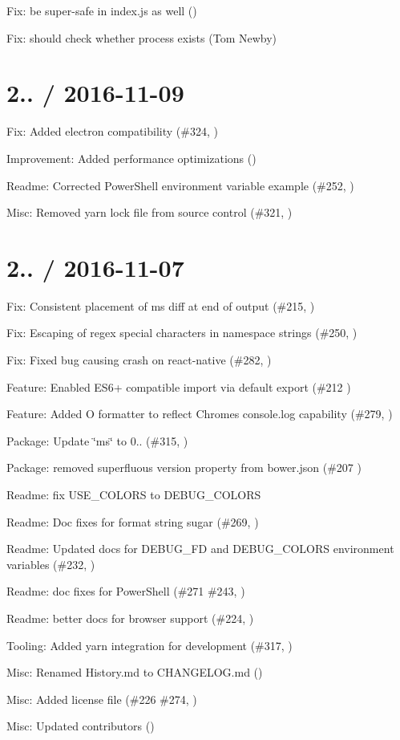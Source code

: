 \begin{DoxyItemize}
\item Fix\+: be super-\/safe in index.\+js as well ()
\item Fix\+: should check whether process exists (Tom Newby)
\end{DoxyItemize}

\section*{2.. / 2016-\/11-\/09 }


\begin{DoxyItemize}
\item Fix\+: Added electron compatibility (\#324, )
\item Improvement\+: Added performance optimizations ()
\item Readme\+: Corrected Power\+Shell environment variable example (\#252, )
\item Misc\+: Removed yarn lock file from source control (\#321, )
\end{DoxyItemize}

\section*{2.. / 2016-\/11-\/07 }


\begin{DoxyItemize}
\item Fix\+: Consistent placement of ms diff at end of output (\#215, )
\item Fix\+: Escaping of regex special characters in namespace strings (\#250, )
\item Fix\+: Fixed bug causing crash on react-\/native (\#282, )
\item Feature\+: Enabled E\+S6+ compatible import via default export (\#212 )
\item Feature\+: Added O formatter to reflect Chrome\textquotesingle{}s console.\+log capability (\#279, )
\item Package\+: Update \char`\"{}ms\char`\"{} to 0.. (\#315, )
\item Package\+: removed superfluous version property from bower.\+json (\#207 )
\item Readme\+: fix U\+S\+E\+\_\+\+C\+O\+L\+O\+RS to D\+E\+B\+U\+G\+\_\+\+C\+O\+L\+O\+RS
\item Readme\+: Doc fixes for format string sugar (\#269, )
\item Readme\+: Updated docs for D\+E\+B\+U\+G\+\_\+\+FD and D\+E\+B\+U\+G\+\_\+\+C\+O\+L\+O\+RS environment variables (\#232, )
\item Readme\+: doc fixes for Power\+Shell (\#271 \#243,  )
\item Readme\+: better docs for browser support (\#224, )
\item Tooling\+: Added yarn integration for development (\#317, )
\item Misc\+: Renamed History.\+md to C\+H\+A\+N\+G\+E\+L\+O\+G.\+md ()
\item Misc\+: Added license file (\#226 \#274,  )
\item Misc\+: Updated contributors ()
\end{DoxyItemize}

